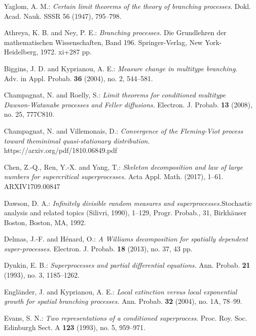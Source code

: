 \documentclass[12pt,a4paper]{amsart}
\numberwithin{equation}{section}
\theoremstyle{plain}
\theoremstyle{definition}
\theoremstyle{remark}
\begin{document}
\begin{thebibliography}{99}
Yaglom, A. M.: \emph{Certain limit theorems of the theory of branching processes}. Dokl. Acad.
Nauk. SSSR 56 (1947), 795--798.

Athreya, K. B. and Ney, P. E.:
\emph{Branching processes.}
Die Grundlehren der mathematischen Wissenschaften, Band 196. Springer-Verlag, New York-Heidelberg, 1972. xi+287 pp.

Biggins, J. D. and Kyprianou, A. E.:
\emph{Measure change in multitype branching.}
Adv. in Appl. Probab. \textbf{36} (2004), no. 2, 544--581.

Champagnat, N. and Roelly, S.:
\emph{Limit theorems for conditioned multitype Dawson-Watanabe processes and Feller diffusions.}
Electron. J. Probab. \textbf{13} (2008), no. 25, 777C810.

Champagnat, N. and Villemonais, D.:
\emph{Convergence of the Fleming-Viot process toward
theminimal quasi-stationary distribution.}
https://arxiv.org/pdf/1810.06849.pdf

Chen, Z.-Q., Ren, Y.-X. and Yang, T.:
\emph{Skeleton decomposition and law of large numbers for supercritical superprocesses.}
Acta Appl. Math. (2017), 1--61.
ARXIV{1709.00847}

Dawson, D. A.:
\emph{Infinitely divisible random measures and superprocesses.}Stochastic analysis and related topics (Silivri, 1990), 1--129,
Progr. Probab., 31, Birkh{\"a}user Boston, Boston, MA, 1992.

Delmas, J.-F. and H\'enard, O.:
\emph{A Williams decomposition for spatially dependent super-processes. }
Electron. J. Probab. \textbf{18} (2013), no. 37, 43 pp.

Dynkin, E. B.:
\emph{Superprocesses and partial differential equations.}
Ann. Probab. \textbf{21} (1993), no. 3, 1185--1262.

Engl\"ander, J. and Kyprianou, A. E.:
\emph{Local extinction versus local exponential growth for spatial branching processes.}
Ann. Probab. \textbf{32} (2004), no. 1A, 78--99.

Evans, S. N.:
\emph{Two representations of a conditioned superprocess.}
Proc. Roy. Soc. Edinburgh Sect. A \textbf{123} (1993), no. 5, 959--971.


\end{thebibliography}
\end{document}
